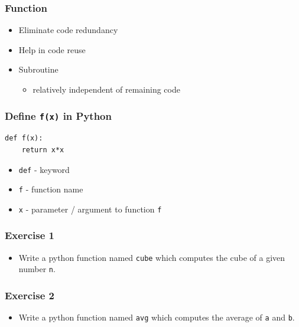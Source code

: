 \documentclass[presentation]{beamer}
\begin{document}
\begin{frame}
\frametitle{Function}
\label{sec-4}


\begin{itemize}
\item Eliminate code redundancy
\item Help in code reuse
\item Subroutine
\begin{itemize}
\item relatively independent of remaining code
\end{itemize}
\end{itemize}
\end{frame}
\begin{frame}[fragile]
\frametitle{Define \verb~f(x)~ in Python}
\label{sec-5}

\lstset{language=Python}
\begin{lstlisting}
def f(x):
    return x*x
\end{lstlisting}


\begin{itemize}
\item \verb~def~ - keyword
\item \verb~f~ - function name
\item \verb~x~ - parameter / argument to function \verb~f~
\end{itemize}
\end{frame}
\begin{frame}
\frametitle{Exercise 1}
\label{sec-6}



\begin{itemize}
\item Write a python function named \verb~cube~ which computes the cube of a given
  number \verb~n~.
\end{itemize}
\end{frame}
\begin{frame}
\frametitle{Exercise 2}
\label{sec-7}



\begin{itemize}
\item Write a python function named \verb~avg~ which computes the average of
  \verb~a~ and \verb~b~.
\end{itemize}
\end{frame}
\end{document}

